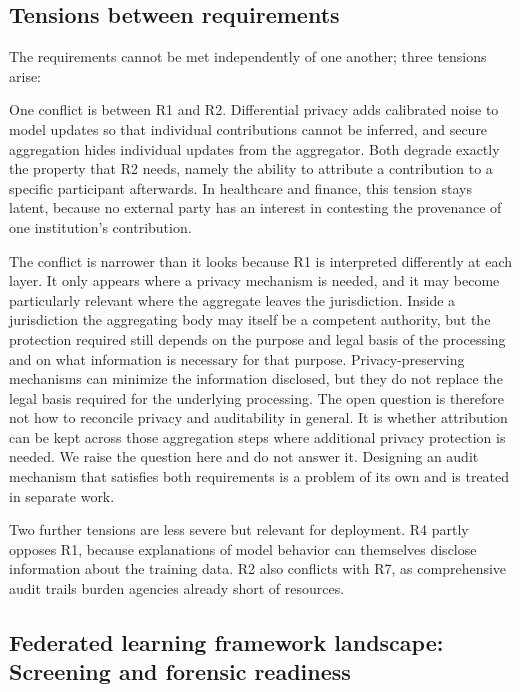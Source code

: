 \subsection{Tensions between requirements}
\label{subsec:req_tensions}

The requirements cannot be met independently of one another; three tensions arise:

One conflict is between R1 and R2. Differential privacy adds calibrated noise to model updates so that individual contributions cannot be inferred, and secure aggregation hides individual updates from the aggregator. Both degrade exactly the property that R2 needs, namely the ability to attribute a contribution to a specific participant afterwards. In healthcare and finance, this tension stays latent, because no external party has an interest in contesting the provenance of one institution's contribution.

The conflict is narrower than it looks because R1 is interpreted differently at each layer. It only appears where a privacy mechanism is needed, and it may become particularly relevant where the aggregate leaves the jurisdiction. Inside a jurisdiction the aggregating body may itself be a competent authority, but the protection required still depends on the purpose and legal basis of the processing and on what information is necessary for that purpose. Privacy-preserving mechanisms can minimize the information disclosed, but they do not replace the legal basis required for the underlying processing. The open question is therefore not how to reconcile privacy and auditability in general. It is whether attribution can be kept across those aggregation steps where additional privacy protection is needed. We raise the question here and do not answer it. Designing an audit mechanism that satisfies both requirements is a problem of its own and is treated in separate work.

Two further tensions are less severe but relevant for deployment. R4 partly opposes R1, because explanations of model behavior can themselves disclose information about the training data. R2 also conflicts with R7, as comprehensive audit trails burden agencies already short of resources.

\subsection{Federated learning framework landscape: Screening and forensic readiness}
\label{subsec:Federated Learning Framework Landscape: Maturity and Forensic Readiness}

